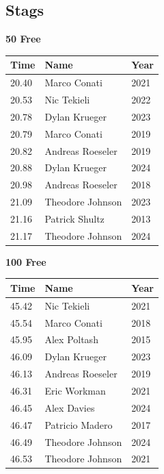 \subsection{Stags}
\vspace{1.2em}
\noindent\begin{minipage}[t]{0.48\textwidth}
\centering
\textbf{\textcolor{teamprimary}{50 Free}}\par
\vspace{0.5em}
\centering
\small
\renewcommand{\arraystretch}{1.0}
\setlength{\tabcolsep}{4pt}
\begin{tabular}{@{}p{1.8cm}p{3.0cm}p{1.0cm}@{}}
\toprule
\textbf{Time} & \textbf{Name} & \textbf{Year} \\
\midrule
20.40 & Marco Conati & 2021 \\
20.53 & Nic Tekieli & 2022 \\
20.78 & Dylan Krueger & 2023 \\
20.79 & Marco Conati & 2019 \\
20.82 & Andreas Roeseler & 2019 \\
20.88 & Dylan Krueger & 2024 \\
20.98 & Andreas Roeseler & 2018 \\
21.09 & Theodore Johnson & 2023 \\
21.16 & Patrick Shultz & 2013 \\
21.17 & Theodore Johnson & 2024 \\
\bottomrule
\end{tabular}
\end{minipage}
\hfill
\begin{minipage}[t]{0.48\textwidth}
\centering
\textbf{\textcolor{teamprimary}{100 Free}}\par
\vspace{0.5em}
\centering
\small
\renewcommand{\arraystretch}{1.0}
\setlength{\tabcolsep}{4pt}
\begin{tabular}{@{}p{1.8cm}p{3.0cm}p{1.0cm}@{}}
\toprule
\textbf{Time} & \textbf{Name} & \textbf{Year} \\
\midrule
45.42 & Nic Tekieli & 2021 \\
45.54 & Marco Conati & 2018 \\
45.95 & Alex Poltash & 2015 \\
46.09 & Dylan Krueger & 2023 \\
46.13 & Andreas Roeseler & 2019 \\
46.31 & Eric Workman & 2021 \\
46.45 & Alex Davies & 2024 \\
46.47 & Patricio Madero & 2017 \\
46.49 & Theodore Johnson & 2024 \\
46.53 & Theodore Johnson & 2021 \\
\bottomrule
\end{tabular}
\end{minipage}

